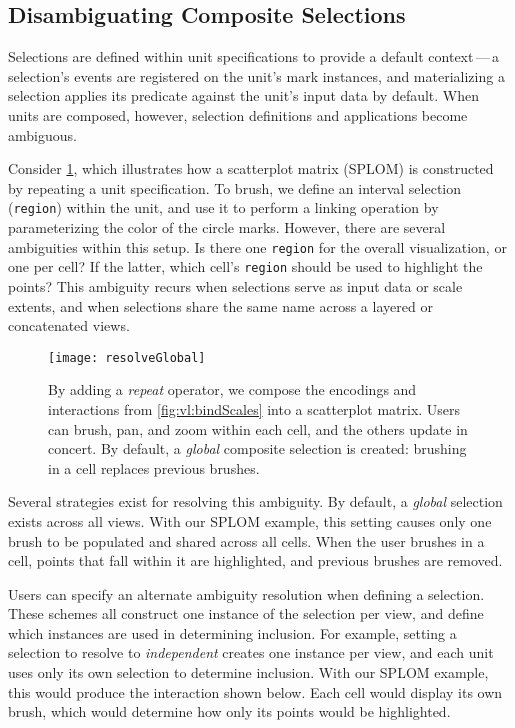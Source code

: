 \subsection{Disambiguating Composite Selections}

Selections are defined within unit specifications to provide a default
context\,---\,a selection's events are registered on the unit's mark instances,
and materializing a selection applies its predicate against the unit's input
data by default. When units are composed, however, selection definitions and
applications become ambiguous.

Consider \cref{fig:vl:resolveGlobal}, which illustrates how a scatterplot matrix
(SPLOM) is constructed by repeating a unit specification. To brush, we define an
interval selection (\texttt{region}) within the unit, and use it to perform a
linking operation by parameterizing the color of the circle marks. However,
there are several ambiguities within this setup. Is there one \texttt{region}
for the overall visualization, or one per cell? If the latter, which cell's
\texttt{region} should be used to highlight the points?  This ambiguity recurs
when selections serve as input data or scale extents, and when selections share
the same name across a layered or concatenated views.

\begin{figure}[h!]
  \centering
  \texttt{[image: resolveGlobal]}
  \caption{By adding a \emph{repeat} operator, we compose the encodings and
  interactions from \cref{fig:vl:bindScales} into a scatterplot matrix. Users can
  brush, pan, and zoom within each cell, and the others update in concert. By
  default, a \emph{global} composite selection is created: brushing in a cell
  replaces previous brushes.}
  \label{fig:vl:resolveGlobal}
\end{figure}

Several strategies exist for resolving this ambiguity. By default, a
\emph{global} selection exists across all views. With our SPLOM example, this
setting causes only one brush to be populated and shared across all cells. When
the user brushes in a cell, points that fall within it are highlighted, and
previous brushes are removed.

Users can specify an alternate ambiguity resolution when defining a selection.
These schemes all construct one instance of the selection per view, and define
which instances are used in determining inclusion. For example, setting a
selection to resolve to \emph{independent} creates one instance per view, and
each unit uses only its own selection to determine inclusion. With our SPLOM
example, this would produce the interaction shown below. Each cell would display
its own brush, which would determine how only its points would be highlighted.

